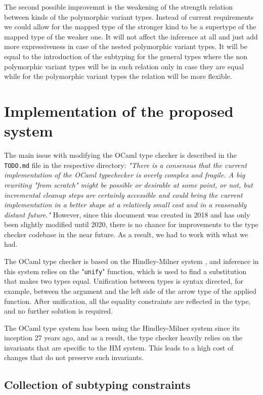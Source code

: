 \documentclass[a4paper,11pt,oneside]{article}
\theoremstyle{definition}
\begin{document}
The second possible improvemnt is the weakening of the strength relation between kinds of the polymorphic variant types.
Instead of current requirements we could allow for the mapped type of the stronger kind to be a supertype of the mapped type of the weaker one.
It will not affect the inference at all and just add more expressiveness in case of the nested polymorphic variant types.
It will be equal to the introduction of the subtyping for the general types where the non polymorphic variant types will be in such relation only in case they are equal while for the polymorphic variant types the relation will be more flexible.

\section{Implementation of the proposed system}

The main issue with modifying the OCaml type checker is described in the
\texttt{TODO.md} file in the respective directory:
{\itshape
"There is a consensus that the current implementation of the OCaml typechecker
is overly complex and fragile. A big rewriting "from scratch" might be possible
or desirable at some point, or not, but incremental cleanup steps are certainly
accessible and could bring the current implementation in a better shape at a
relatively small cost and in a reasonably distant future."
}
However, since this document was created in 2018 and has
only been slightly modified until 2020, there is no chance for improvements
to the type checker codebase in the near future. As a result, we had to work
with what we had.

The OCaml type checker is based on the Hindley-Milner system \cite{Hindley_1969}
\cite{Milner_1978}, and inference in this system relies on the "\texttt{unify}"
function, which is used to find a substitution that makes two types equal.
Unification between types is syntax directed, for example,
between the argument and the left side of the arrow type of the applied
function. After unification, all the equality constraints are reflected in
the type, and no further solution is required.

The OCaml type system has been using the Hindley-Milner system since its
inception 27 years ago, and as a result, the type checker heavily relies
on the invariants that are specific to the HM system. This leads to a high
cost of changes that do not preserve such invariants.

\subsection{Collection of subtyping constraints}
\end{document}

